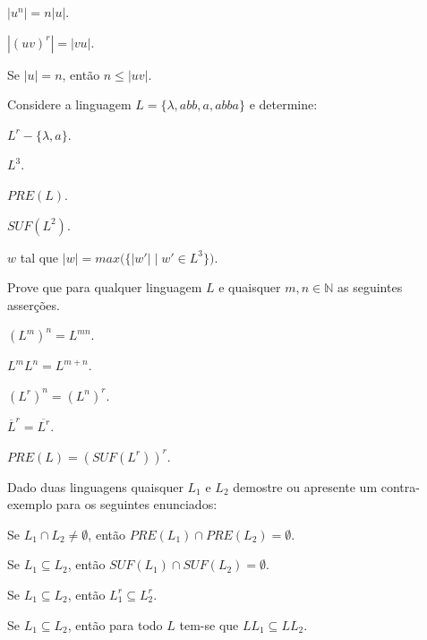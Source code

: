 \begin{exerList}
	\item $|u^n| = n|u|$.
	\item $|(uv)^r| = |vu|$.
	\item Se $|u| = n$, então $n \leq |uv|$.
\end{exerList}

\begin{questao}\label{exer:LF3}
	Considere a linguagem $L = \{\lambda, abb, a, abba\}$ e determine:
\end{questao}

\begin{exerList}
	\item $L^r - \{\lambda, a\}$.
	\item $L^3$.
	\item $PRE(L)$.
	\item $SUF(L^2)$.
	\item $w$ tal que $|w| = max\Big(\{|w'| \mid w' \in L^3\}\Big)$.
\end{exerList}

\begin{questao}\label{exer:LF4}
	Prove que para qualquer linguagem $L$ e quaisquer $m,n \in \mathbb{N}$ as seguintes asserções.
\end{questao}

\begin{exerList}
	\item $(L^m)^n = L^{mn}$.
	\item $L^mL^n = L^{m+n}$.
	\item $(L^r)^n = (L^n)^r$.
	\item $\overline{L}^r = \overline{L^r}$.
	\item $PRE(L) = (SUF(L^r))^r$.
\end{exerList}

\begin{questao}\label{exer:LF5}
	Dado duas linguagens quaisquer $L_1$ e $L_2$ demostre ou apresente um contra-exemplo para os seguintes enunciados:
\end{questao}

\begin{exerList}
	\item Se $L_1 \cap L_2 \neq \emptyset$, então $PRE(L_1) \cap PRE(L_2) = \emptyset$.
	\item Se $L_1 \subseteq L_2$, então $SUF(L_1) \cap SUF(L_2) = \emptyset$.
	\item Se $L_1 \subseteq L_2$, então $L_1^r \subseteq L_2^r$.
	\item Se $L_1 \subseteq L_2$, então para todo $L$ tem-se que $LL_1 \subseteq LL_2$. 
\end{exerList}

